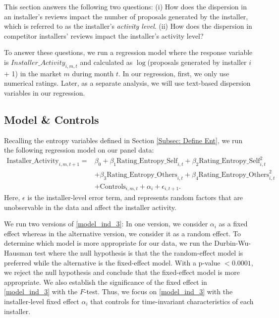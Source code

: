\documentclass[msom,blindrev]{informs3}
\begin{document}
This section answers the following two questions: (i) How does the dispersion in an installer's reviews impact the  number of proposals generated by the installer, which is referred to as the installer's \emph{activity level}. (ii) How does the dispersion in competitor installers' reviews impact the installer's activity level?

To answer these questions, we run a regression model where the response variable is $Installer\_Activity_{i,m,t}$ and calculated as $\log$(proposals generated by installer $i$ + 1) in the market $m$ during month $t$. In our regression, first, we only use numerical ratings. Later, as a separate analysis, we will use text-based dispersion variables in our regression.

\subsection{Model \& Controls}

Recalling the entropy variables defined in Section \ref{Subsec: Define Ent}, we run the following regression model on our panel data:
\begin{align}  \nonumber
    \text{Installer\_Activity}_{i,m,t+1}=&\beta_{0}+\beta_{1} \text{Rating\_Entropy\_Self}_{i,t}+\beta_{2} \text{Rating\_Entropy\_Self}_{i,t}^ {2}
    \\ \nonumber
    &+\beta_{3} \text{Rating\_Entropy\_Others}_{i,t}  +\beta_{4}\text{Rating\_Entropy\_Others}_{i,t}^{2} \\ \label{model_ind_3}
    &+ \text{Controls}_{i,m,t}+ \alpha_{i} + \epsilon_{i,t+1}.
\end{align}
 Here, $\epsilon$ is the installer-level error term, and represents random factors that are unobservable in the data and affect the installer activity.


 We run two versions of \eqref{model_ind_3}: In one version, we consider $\alpha_{i}$ as a fixed effect whereas in the alternative version, we consider it as a random effect. To determine which model is more appropriate for our data, we run the Durbin-Wu-Hausman test where the null hypothesis is that the the random-effect model is preferred while the alternative is the fixed-effect model. With a p-value $<0.0001$, we reject the null hypothesis and conclude that the fixed-effect model is more appropriate. We also establish the significance of the fixed effect in \eqref{model_ind_3} with the $F$-test. Thus, we focus on \eqref{model_ind_3} with the installer-level fixed effect $\alpha_{i}$ that controls for time-invariant characteristics of each installer.
\end{document}
